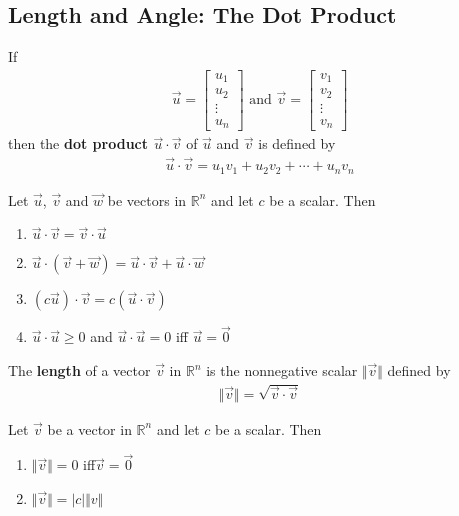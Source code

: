 \documentclass{article}
\begin{document}
\subsection{Length and Angle: The Dot Product}
\begin{definition}
    If
    \begin{gather*}
        \vec u = \begin{bmatrix}
            u_1 \\u_2\\\vdots\\u_n
        \end{bmatrix} \text{  and  }
        \vec v = \begin{bmatrix}
            v_1 \\v_2\\\vdots\\v_n
        \end{bmatrix}
    \end{gather*}
    then the \textbf{dot product $\vec u \cdot \vec v$} of $\vec u$ and $\vec v$ is defined by
    \begin{gather*}
        \vec u \cdot \vec v = u_1v_1 + u_2v_2 + \cdots + u_nv_n
    \end{gather*}
\end{definition}
\begin{theorem}
    Let $\vec u$, $\vec v$ and $\vec w$ be vectors in $\mathbb{R}^n$ and let $c$ be a scalar. Then
    \begin{enumerate}
        \item $\vec u \cdot \vec v = \vec v \cdot \vec u$
        \item $\vec u \cdot (\vec v + \vec w) = \vec u \cdot \vec v + \vec u \cdot \vec w$
        \item $(c\vec u) \cdot \vec v = c(\vec u \cdot \vec v)$
        \item $\vec u \cdot \vec u \geq 0$ and $\vec u \cdot \vec u = 0$ iff $\vec u = \vec 0$
    \end{enumerate}
\end{theorem}
\begin{definition}
    The \textbf{length} of a vector $\vec v$ in $\mathbb{R}^n$ is the nonnegative scalar $\Vert\vec v\Vert$ defined by
    \begin{gather*}
        \Vert\vec v\Vert = \sqrt{\vec v \cdot \vec v}
    \end{gather*}
\end{definition}
\begin{theorem}
    Let $\vec v$ be a vector in $\mathbb{R}^n$ and let $c$ be a scalar. Then
    \begin{enumerate}
        \item $\Vert\vec v\Vert = 0$ iff$\vec v = \vec 0$
        \item $\Vert\vec v\Vert = |c|\Vert v\Vert$
    \end{enumerate}
\end{theorem}
\end{document}

